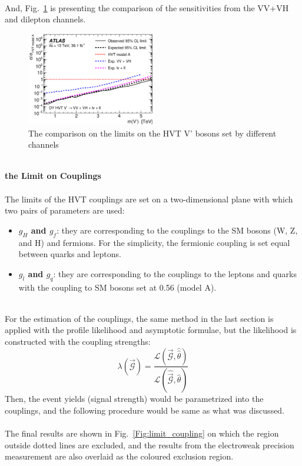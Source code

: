\\And, Fig.~\ref{Fig:limit_GGFHVTV_compare} is presenting the comparison of the sensitivities from the VV+VH and dilepton channels. 
\begin{figure}[ht]
	\centering
    \includegraphics[width=0.5\textwidth]{Chapter4/GGFALLHVTV_compare.eps}
    \caption{The comparison on the limits on the HVT V' bosons set by different channels}
	\label{Fig:limit_GGFHVTV_compare}
\end{figure}
\noindent
\\{\bf the Limit on Couplings}
\\
\\The limits of the HVT couplings are set on a two-dimensional plane with which two pairs of parameters are used:
\begin{itemize}
  \item[] {\bf $g_{H}$ and $g_{f}$}: they are corresponding to the couplings to the SM bosons (W, Z, and H) and fermions. For the simplicity, the fermionic coupling is set equal between quarks and leptons. 
  \item[] {\bf $g_{l}$ and $g_{q}$}: they are corresponding to the couplings to the leptons and quarks with the coupling to SM bosons set at 0.56 (model A).
\end{itemize}
\noindent
\\For the estimation of the couplings, the same method in the last section is applied with the profile likelihood and asymptotic formulae, but the likelihood is constructed with the coupling strengths:
\begin{equation}
\lambda(\vec{\mathcal{G}}) = \frac{\mathcal{L}(\vec{\mathcal{G}},\hat{\hat{\theta}})}{\mathcal{L}(\hat{\vec{\mathcal{G}}},\hat{\theta})}
\end{equation}
Then, the event yields (signal strength) would be parametrized into the couplings, and the following procedure would be same as what was discussed.
\\
\\The final results are shown in Fig.~\ref{Fig:limit_coupling} on which the region outside dotted lines are excluded, and the results from the electroweak precision measurement are also overlaid as the coloured exclusion region.   
